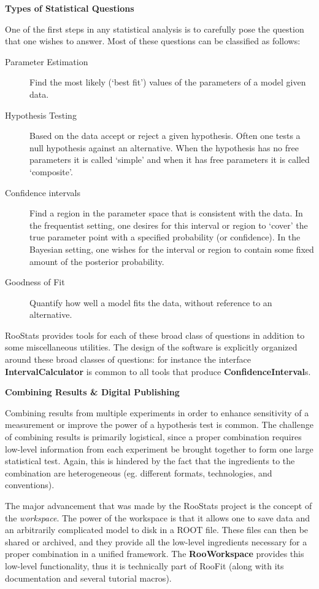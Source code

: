 \documentclass[11pt]{article}
\begin{document}
{\flushleft \textbf{Types of Statistical Questions}}

One of the first steps in any statistical analysis is to carefully pose the question that one wishes to answer.  Most of these questions can be classified as follows:
\begin{description}
 \item[Parameter Estimation] Find the most likely (`best fit') values of the parameters of a model given data.
 \item[Hypothesis Testing] Based on the data accept or reject a given hypothesis.  Often one tests a null hypothesis against an alternative.  When the hypothesis has no free parameters it is called `simple' and when it has free parameters it is called `composite'.
 \item[Confidence intervals] Find a region in the parameter space that is consistent with the data.  In the frequentist setting, one desires for this interval or region to `cover' the true parameter point with a specified probability (or confidence).  In the Bayesian setting, one wishes for the interval or region to contain some fixed amount of the posterior probability.
 \item[Goodness of Fit] Quantify how well a model fits the data, without reference to an alternative.
\end{description}
RooStats provides tools for each of these broad class of questions in addition to some miscellaneous utilities.  The design of the software is explicitly organized around these broad classes of questions: for instance the interface \textbf{IntervalCalculator} is common to all tools that produce \textbf{ConfidenceInterval}s. 

{\flushleft \textbf{Combining Results \& Digital Publishing}}

Combining results from multiple experiments in order to enhance sensitivity of a measurement or improve the power of a hypothesis test is common.  The challenge of combining results is primarily logistical, since a proper combination requires low-level information from each experiment be brought together to form one large statistical test. Again, this is hindered by the fact that the ingredients to the combination are heterogeneous (eg. different formats, technologies, and conventions).  

The major advancement that was made by the RooStats project is the concept of the \textit{workspace}.   The power of the workspace is that it allows one to save data and an arbitrarily complicated model to disk in a ROOT file.  These files can then be shared or archived, and they provide all the low-level ingredients necessary for a proper combination in a unified framework.   The \textbf{ RooWorkspace} provides this low-level functionality, thus it is technically part of RooFit (along with its documentation and several tutorial macros).
\end{document}
